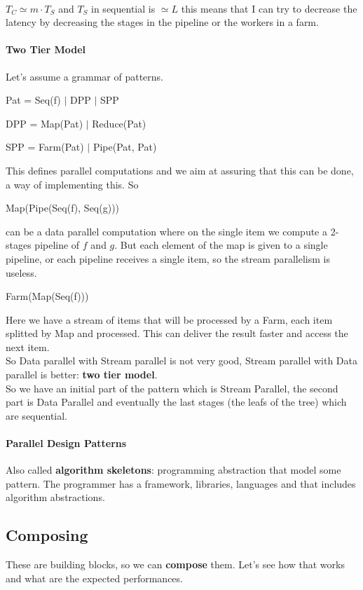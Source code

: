 \documentclass[10pt]{report}
\begin{document}
\paragraph{} $T_C \simeq m\cdot T_S$ and $T_S$ in sequential is $\simeq L$ this means that I can try to decrease the latency by decreasing the stages in the pipeline or the workers in a farm.
\paragraph{Two Tier Model} Let's assume a grammar of patterns.\begin{list}{}{}
	\item Pat = Seq(f) $|$ DPP $|$ SPP
	\item DPP = Map(Pat) $|$ Reduce(Pat)
	\item SPP = Farm(Pat) $|$ Pipe(Pat, Pat)
\end{list}
This defines parallel computations and we aim at assuring that this can be done, a way of implementing this. So\begin{list}{}{}
	\item Map(Pipe(Seq(f), Seq(g)))
\end{list}
can be a data parallel computation where on the single item we compute a 2-stages pipeline of $f$ and $g$. But each element of the map is given to a single pipeline, or each pipeline receives a single item, so the stream parallelism is useless.
\begin{list}{}{}
	\item Farm(Map(Seq(f)))
\end{list}
Here we have a stream of items that will be processed by a Farm, each item splitted by Map and processed. This can deliver the result faster and access the next item.\\
So Data parallel with Stream parallel is not very good, Stream parallel with Data parallel is better: \textbf{two tier model}.\\
So we have an initial part of the pattern which is Stream Parallel, the second part is Data Parallel and eventually the last stages (the leafs of the tree) which are sequential.
\paragraph{Parallel Design Patterns}
Also called \textbf{algorithm skeletons}: programming abstraction that model some pattern. The programmer has a framework, libraries, languages and that includes algorithm abstractions.
\subsection{Composing}
These are building blocks, so we can \textbf{compose} them. Let's see how that works and what are the expected performances.
\end{document}
